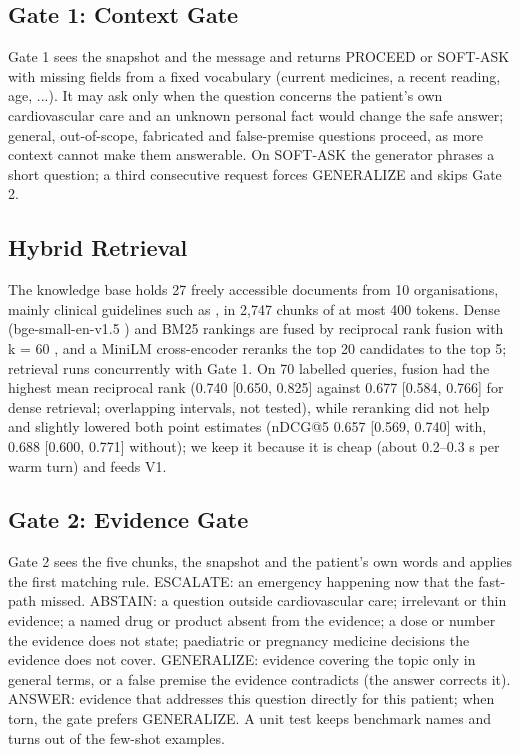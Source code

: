 \documentclass[conference]{IEEEtran}
\begin{document}
\subsection{Gate 1: Context Gate}

Gate 1 sees the snapshot and the message and returns PROCEED or SOFT-ASK with missing fields from a fixed vocabulary (current medicines, a recent reading, age, ...). It may ask only when the question concerns the patient's own cardiovascular care and an unknown personal fact would change the safe answer; general, out-of-scope, fabricated and false-premise questions proceed, as more context cannot make them answerable. On SOFT-ASK the generator phrases a short question; a third consecutive request forces GENERALIZE and skips Gate 2.

\subsection{Hybrid Retrieval}

The knowledge base holds 27 freely accessible documents from 10 organisations, mainly clinical guidelines such as \cite{jones2025aha}, in 2,747 chunks of at most 400 tokens. Dense (bge-small-en-v1.5 \cite{xiao2024cpack}) and BM25 rankings are fused by reciprocal rank fusion with k = 60 \cite{cormack2009rrf}, and a MiniLM cross-encoder reranks the top 20 candidates to the top 5; retrieval runs concurrently with Gate 1. On 70 labelled queries, fusion had the highest mean reciprocal rank (0.740 [0.650, 0.825] against 0.677 [0.584, 0.766] for dense retrieval; overlapping intervals, not tested), while reranking did not help and slightly lowered both point estimates (nDCG@5 0.657 [0.569, 0.740] with, 0.688 [0.600, 0.771] without); we keep it because it is cheap (about 0.2--0.3 s per warm turn) and feeds V1.

\subsection{Gate 2: Evidence Gate}

Gate 2 sees the five chunks, the snapshot and the patient's own words and applies the first matching rule. ESCALATE: an emergency happening now that the fast-path missed. ABSTAIN: a question outside cardiovascular care; irrelevant or thin evidence; a named drug or product absent from the evidence; a dose or number the evidence does not state; paediatric or pregnancy medicine decisions the evidence does not cover. GENERALIZE: evidence covering the topic only in general terms, or a false premise the evidence contradicts (the answer corrects it). ANSWER: evidence that addresses this question directly for this patient; when torn, the gate prefers GENERALIZE. A unit test keeps benchmark names and turns out of the few-shot examples.
\end{document}
